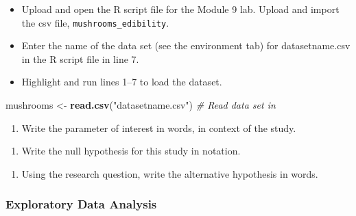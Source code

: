 \documentclass[
]{report}
\newenvironment{Shaded}{\begin{snugshade}}{\end{snugshade}}
\newcommand{\CommentTok}[1]{\textcolor[rgb]{0.56,0.35,0.01}{\textit{#1}}}
\newcommand{\FunctionTok}[1]{\textcolor[rgb]{0.13,0.29,0.53}{\textbf{#1}}}
\newcommand{\NormalTok}[1]{#1}
\newcommand{\OtherTok}[1]{\textcolor[rgb]{0.56,0.35,0.01}{#1}}
\newcommand{\StringTok}[1]{\textcolor[rgb]{0.31,0.60,0.02}{#1}}
\providecommand{\tightlist}{%
  \setlength{\itemsep}{0pt}\setlength{\parskip}{0pt}}
\begin{document}
\begin{itemize}
\item
  Upload and open the R script file for the Module 9 lab. Upload and import the csv file, \texttt{mushrooms\_edibility}.
\item
  Enter the name of the data set (see the environment tab) for datasetname.csv in the R script file in line 7.
\item
  Highlight and run lines 1--7 to load the dataset.
\end{itemize}

\begin{Shaded}
\begin{Highlighting}[]
\NormalTok{mushrooms }\OtherTok{\textless{}{-}} \FunctionTok{read.csv}\NormalTok{(}\StringTok{"datasetname.csv"}\NormalTok{) }\CommentTok{\# Read data set in}
\end{Highlighting}
\end{Shaded}

\begin{enumerate}
\def\labelenumi{\arabic{enumi}.}
\tightlist
\item
  Write the parameter of interest in words, in context of the study.
\end{enumerate}

\vspace{1in}

\begin{enumerate}
\def\labelenumi{\arabic{enumi}.}
\setcounter{enumi}{1}
\tightlist
\item
  Write the null hypothesis for this study in notation.
\end{enumerate}

\vspace{0.25in}

\newpage

\begin{enumerate}
\def\labelenumi{\arabic{enumi}.}
\setcounter{enumi}{2}
\tightlist
\item
  Using the research question, write the alternative hypothesis in words.
\end{enumerate}

\vspace{1in}

\subsubsection*{Exploratory Data Analysis}\label{exploratory-data-analysis-2}
\end{document}
